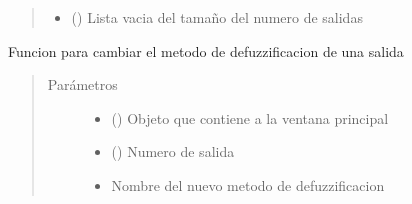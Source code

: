 \documentclass[letterpaper,10pt,spanish]{sphinxmanual}
\begin{document}
\begin{fulllineitems}
\begin{fulllineitems}
\begin{quote}
\begin{description}
\begin{itemize}
\item {} 
 () \textendash{} Lista vacia del tamaño del numero de salidas

\end{itemize}

\end{description}\end{quote}

\end{fulllineitems}


\begin{fulllineitems}
\label{\detokenize{codigos/rutinas_fuzzy:rutinas_fuzzy.FuzzyController.cambiar_metodo}}
Funcion para cambiar el metodo de defuzzificacion de una salida
\begin{quote}\begin{description}
\item[{Parámetros}] \leavevmode\begin{itemize}
\item {} 
 () \textendash{} Objeto que contiene a la ventana principal

\item {} 
 () \textendash{} Numero de salida

\item {} 
 \textendash{} Nombre del nuevo metodo de defuzzificacion

\end{itemize}

\end{description}\end{quote}

\end{fulllineitems}



\end{fulllineitems}
\end{document}
